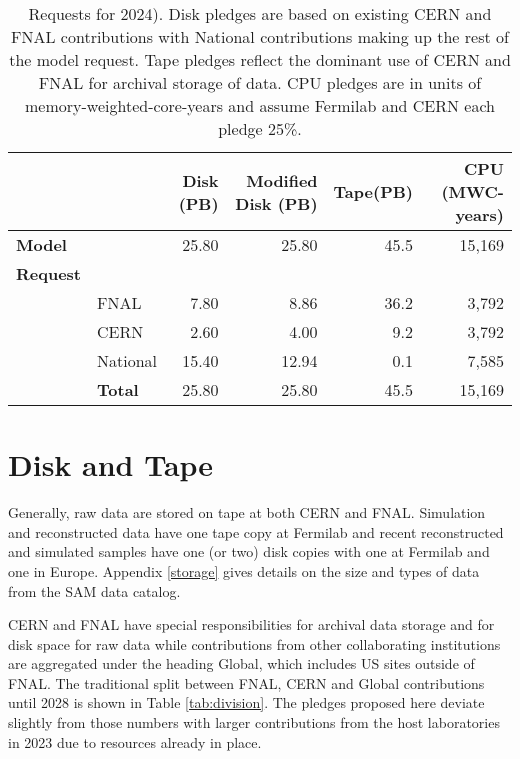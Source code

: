 \documentclass[12pt]{article}
\begin{document}
\begin{table}[ht]
\begin{centering}

\begin{tabular}{|ll|rr|r|r|}
\hline
 	&&	Disk (PB)	&	Modified Disk (PB)	&	Tape(PB)	&	CPU (MWC-years)	\\
	\hline
{\bf Model}	&&	25.80	&	25.80	&	45.5	&	15,169	\\
\hline
{\bf Request}	&&		&		&		&		\\
&FNAL	&	7.80	&	8.86	&	36.2	&	3,792	\\
&CERN	&	2.60	&	4.00	&	9.2	&	3,792	\\
&National	&	15.40	&	12.94	&	0.1	&	7,585\\
\hline
&{\bf Total}	&	25.80	&	25.80	&	45.5	&	15,169	\\
\hline
\end{tabular}

\caption{Requests for 2024).  Disk pledges are based on existing CERN and FNAL contributions with National contributions making up the rest of the model request.  Tape pledges reflect the dominant use of CERN and FNAL for archival storage of data.  CPU pledges are in units of memory-weighted-core-years and assume Fermilab and CERN each pledge 25\%.   }
\end{centering}
\label{tab:summary2024}
\end{table}



\clearpage

\section{Disk and Tape}

Generally, raw data are stored on tape at both CERN and FNAL.  Simulation and reconstructed data  have one tape copy at Fermilab and recent reconstructed and simulated samples have one (or two) disk copies with one at Fermilab and one in Europe.  Appendix \ref{storage} gives details on the size and types of data from the SAM data catalog.

CERN and FNAL have special responsibilities for archival data storage and for disk space for raw data while contributions from  other collaborating institutions are aggregated under the heading Global, which includes US sites outside of FNAL.  The traditional split between FNAL, CERN and Global contributions until 2028 is shown in Table \ref{tab:division}.  The pledges proposed here deviate slightly from those numbers with larger contributions from the host laboratories in 2023 due to resources already in place. 
\end{document}
